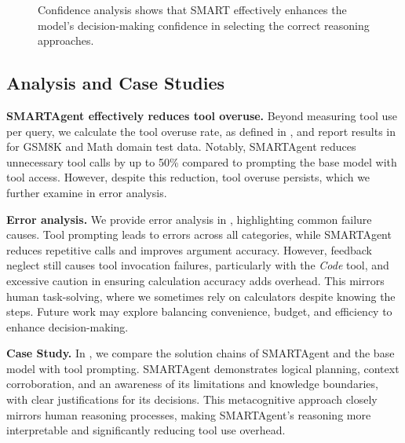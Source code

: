 \begin{figure}[!t]
    \centering
    \caption{Confidence analysis shows that SMART effectively enhances the model's decision-making confidence in selecting the correct reasoning approaches.}
    \label{fig:analysis_confidence}
\end{figure}


\subsection{Analysis and Case Studies}

\noindent\textbf{SMARTAgent effectively reduces tool overuse.} Beyond measuring tool use per query, we calculate the tool overuse rate, as defined in , and report results in  for GSM8K and Math domain test data. Notably, SMARTAgent reduces unnecessary tool calls by up to 50\% compared to prompting the base model with tool access. However, despite this reduction, tool overuse persists, which we further examine in error analysis.

\vspace{1.5mm}
\noindent\textbf{Error analysis.} We provide error analysis in , highlighting common failure causes. Tool prompting leads to errors across all categories, while SMARTAgent reduces repetitive calls and improves argument accuracy. However, feedback neglect still causes tool invocation failures, particularly with the \textit{Code} tool, and excessive caution in ensuring calculation accuracy adds overhead. This mirrors human task-solving, where we sometimes rely on calculators despite knowing the steps. Future work may explore balancing convenience, budget, and efficiency to enhance decision-making.


\vspace{1.5mm}
\noindent\textbf{Case Study.} In , we compare the solution chains of SMARTAgent and the base model with tool prompting. SMARTAgent demonstrates logical planning, context corroboration, and an awareness of its limitations and knowledge boundaries, with clear justifications for its decisions. This metacognitive approach closely mirrors human reasoning processes, making SMARTAgent's reasoning more interpretable and significantly reducing tool use overhead.


